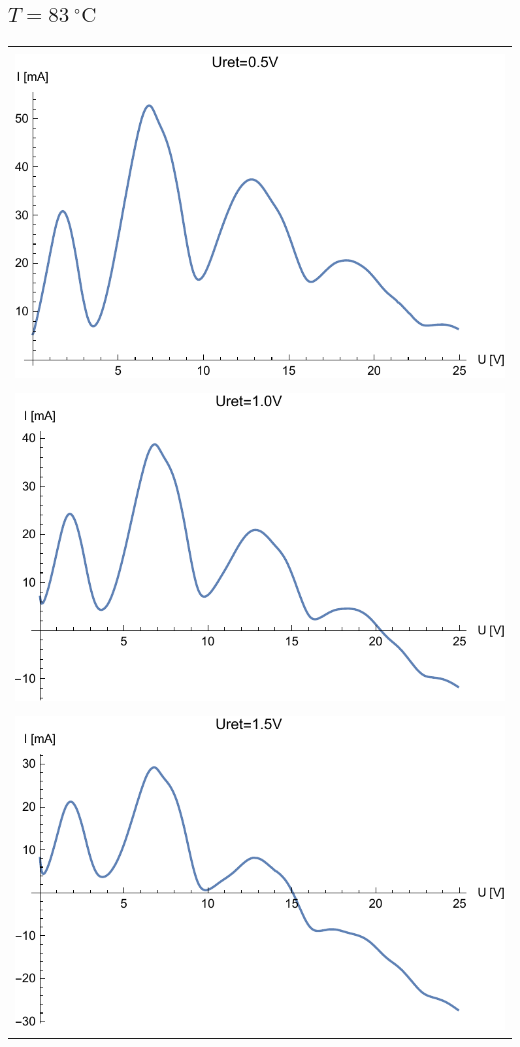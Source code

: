 \documentclass[paper=a4, fontsize=12pt]{scrartcl}
\begin{document}
{{\subsection{$T=83\:^\circ\mathrm{C}$}
\begin{tabular}{|c|}
	\hline\\
\includegraphics[width=0.625\linewidth]{wyk16}
\label{fig:wyk16}\\
\hline\\
\includegraphics[width=0.625\linewidth]{wyk17}
\label{fig:wyk17}\\
\hline\\
\includegraphics[width=0.625\linewidth]{wyk18}
\label{fig:wyk18}\\
\hline
\end{tabular}

}}
\end{document}

